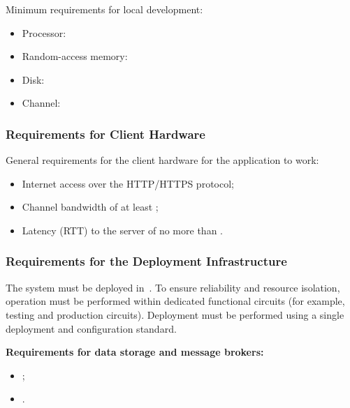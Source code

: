 \documentclass[12pt,a4paper]{extarticle}
\begin{document}
Minimum requirements for local development:

\begin{itemize}[leftmargin=1.25cm]
\item Processor: 
\item Random-access memory: 
\item Disk: 
\item Channel: 
\end{itemize}

\subsubsection{Requirements for Client Hardware}

General requirements for the client hardware for the application to work:

\begin{itemize}[leftmargin=1.25cm]
\item Internet access over the HTTP/HTTPS protocol;
\item Channel bandwidth of at least ;
\item Latency (RTT) to the server of no more than .
\end{itemize}

\subsubsection{Requirements for the Deployment Infrastructure}
\label{sec:deployment_infra}

The system must be deployed in~. To ensure reliability and resource isolation, operation must be performed within dedicated functional circuits (for example, testing and production circuits). Deployment must be performed using a single deployment and configuration standard.

\textbf{Requirements for data storage and message brokers:}

\begin{itemize}[leftmargin=1.25cm]
\item {};
\item {}.
\end{itemize}
\end{document}
